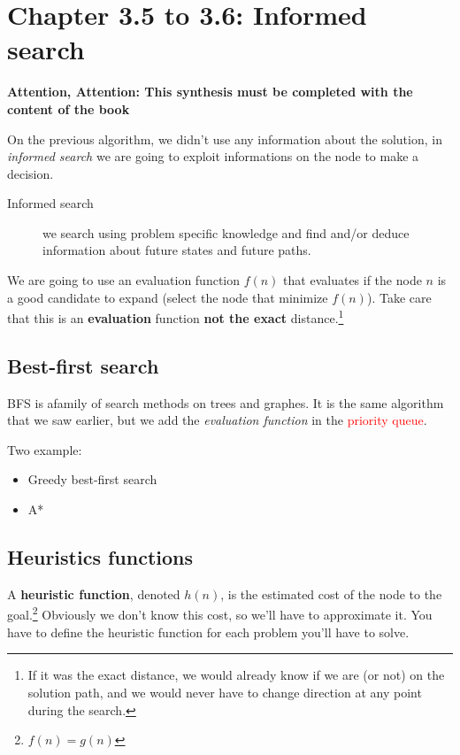 \section{Chapter 3.5 to 3.6: Informed search}

\textbf{Attention, Attention: This synthesis must be completed with the content of the book}

On the previous algorithm, we didn't use any information about the solution, in \textit{informed search} we are going to exploit informations on the node to make a decision.

\begin{description}
\item[Informed search] we search using problem specific knowledge and find and/or deduce information about future states and future paths.
\end{description}

We are going to use an evaluation function $f(n)$ that evaluates if the node $n$ is a good candidate to expand (select the node that minimize $f(n)$). Take care that this is an \textbf{evaluation} function \textbf{not the exact} distance.\footnote{If it was the exact distance, we would already know if we are (or not) on the solution path, and we would never have to change direction at any point during the search.}

\subsection{Best-first search}

BFS is afamily of search methods on trees and graphes. It is the same algorithm that we saw earlier, but we add the \textit{evaluation function} in the \textcolor{red}{priority queue}.

Two example:
\begin{itemize}
\item Greedy best-first search
\item A*
\end{itemize}

\subsection{Heuristics functions}

A \textbf{heuristic function}, denoted $h(n)$, is the estimated cost of the node to the goal.\footnote{$f(n)=g(n)$} Obviously we don't know this cost, so we'll have to approximate it. You have to define the heuristic function for each problem you'll have to solve. 

